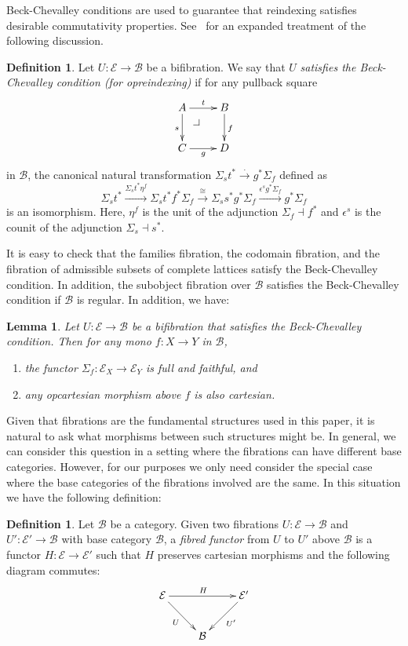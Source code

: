 \documentclass{LMCS}
\makeatletter
\newcommand\pbc[1][dr]{\save*!/#1-1.8pc/#1:(-1,1)@^{|-}\restore}
\newcommand\E{{\mathcal E}}
\newcommand\B{{\mathcal B}}
\theoremstyle{plain}
\newtheorem{lemma}[theorem]{Lemma}
\theoremstyle{remark}
\theoremstyle{definition}
\newtheorem{definition}[theorem]{Definition}
\makeatother
\begin{document}
Beck-Chevalley conditions are used to guarantee that reindexing
satisfies desirable commutativity properties. See~\cite{jac99} for an
expanded treatment of the following discussion.

\begin{definition}\label{def:beckcc}
  Let $U:\E\to\B$ be a bifibration. We say that $U$ \emph{satisfies
    the Beck-Chevalley condition (for opreindexing)} if for any
  pullback square
  \[ \xymatrix{ A \ar[r]^t \ar[d]_s \pbc& B \ar[d]^f \\ C \ar[r]_g &
    D} \] in $\B$, the canonical natural transformation $\Sigma_s t^*
  \xrightarrow{.} g^*\Sigma_f$ defined as \[\Sigma_s t^*
  \xrightarrow{\Sigma_st^* \eta^f} \Sigma_s t^* f^*\Sigma_f
  \xrightarrow{\cong} \Sigma_s s^* g^* \Sigma_f
  \xrightarrow{\epsilon^s g^*\Sigma_f} g^* \Sigma_f\] is an
  isomorphism. Here, $\eta^f$ is the unit of the adjunction
  $\Sigma_f\dashv f^*$ and $\epsilon^s$ is the counit of the
  adjunction $\Sigma_s\dashv s^*$.
\end{definition}
\noindent 
It is easy to check that the families fibration, the codomain
fibration, and the fibration of admissible subsets of complete
lattices satisfy the Beck-Chevalley condition. In addition, the
subobject fibration over $\B$ satisfies the Beck-Chevalley condition
if $\B$ is regular. In addition, we have:

\begin{lemma}\label{lem:bcmono}
  Let $U:\E\to\B$ be a bifibration that satisfies the Beck-Chevalley
  condition. Then for any mono $f:X\to Y$ in $\B$,
  \begin{enumerate}[\em(1)]
  \item the functor $\Sigma_f:\E_X\to\E_Y$ is full and faithful, and
  \item any opcartesian morphism above $f$ is also cartesian.
  \end{enumerate}
\end{lemma}

Given that fibrations are the fundamental structures used in this
paper, it is natural to ask what morphisms between such structures
might be. In general, we can consider this question in a setting where
the fibrations can have different base categories. However, for our
purposes we only need consider the special case where the base
categories of the fibrations involved are the same. In this situation
we have the following definition:

\begin{definition}
  Let $\B$ be a category. Given two fibrations $U:\E\to\B$ and
  $U':\E'\to\B$ with base category $\B$, a {\em fibred functor} from
  $U$ to $U'$ above $\B$ is a functor $H:\E\to\E'$ such that $H$
  preserves cartesian morphisms and the following diagram commutes:
  \[\xymatrix{\E \ar[rd]_U \ar[rr]^H && \E' \ar[ld]^{U'}\\
    & \B}\]
\end{definition}
\end{document}
